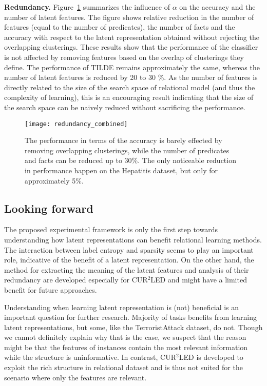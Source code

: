 \textbf{Redundancy.}
Figure~\ref{fig:Redundancy} summarizes the influence of $\alpha$ on the accuracy and the number of latent features.
The figure shows relative reduction in the number of features (equal to the number of predicates), the number of facts and the accuracy with  respect to the latent representation obtained without rejecting the overlapping clusterings.
These results show that the performance of the classifier is not affected by removing features based on the overlap of clusterings they define.
The performance of TILDE remains approximately the same, whereas the number of latent features is reduced by 20 to 30 \%.
As the number of features is directly related to the size of the search space of relational model (and thus the complexity of learning), this is an encouraging result indicating that the size of the search space can be naively reduced without sacrificing the performance.








\begin{figure}[t]
	\centering
	\medskip
    \texttt{[image: redundancy\_combined]}
    \caption{The performance in terms of the accuracy is barely effected by removing overlapping clusterings, while the number of predicates and facts can be reduced up to 30\%. The only noticeable reduction in performance happen on the Hepatitis dataset, but only for approximately 5\%.   }
    \label{fig:Redundancy}
\end{figure}







\subsection{Looking forward}


The proposed experimental framework is only the first step towards understanding how latent representations can benefit relational learning methods.
The interaction between label entropy and sparsity seems to play an important role, indicative of the benefit of a latent representation.
On the other hand, the method for extracting the meaning of the latent features and analysis of their redundancy are developed especially for CUR$^2$LED and might have a limited benefit for future approaches.



Understanding when learning latent representation is (not) beneficial is an important question for further research.
Majority of tasks benefits from learning latent representations, but some, like the TerroristAttack dataset, do not.
Though we cannot definitely explain why that is the case, we suspect that the reason might be that the features of instances contain the most relevant information while the structure is uninformative.
In contrast, CUR$^2$LED is developed to exploit the rich structure in relational dataset and is thus not suited for the scenario where only the features are relevant.




